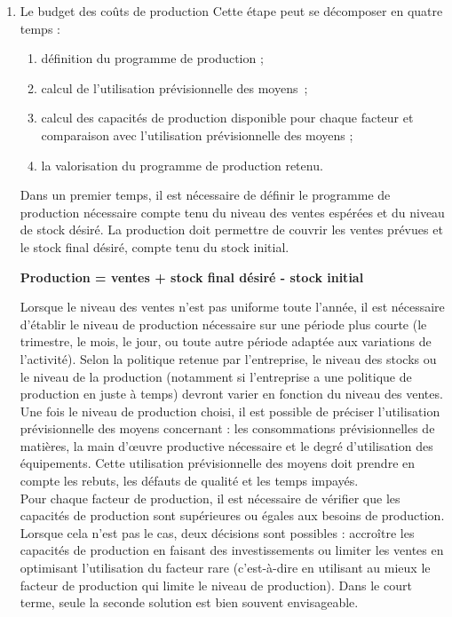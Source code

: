 \documentclass{tufte-handout}
\begin{document}
\begin{enumerate}
\item Le budget des coûts de production
\label{sec:orgf7d48d8}
Cette étape peut se décomposer en quatre temps :\\
\begin{enumerate}
\item définition du programme de production ;\\
\item calcul de l'utilisation prévisionnelle des moyens ;\\
\item calcul des capacités de production disponible pour chaque facteur et comparaison avec l'utilisation prévisionnelle des moyens ;\\
\item la valorisation du programme de production retenu.\\
\end{enumerate}
Dans un premier temps, il est nécessaire de définir le programme de production nécessaire compte tenu du niveau des ventes espérées et du niveau de stock désiré. La production doit permettre de couvrir les ventes prévues et le stock final désiré, compte tenu du stock initial.\\
\begin{center}
\textbf{Production = ventes + stock final désiré - stock initial}\\
\end{center}
Lorsque le niveau des ventes n'est pas uniforme toute l'année, il est nécessaire d'établir le niveau de production nécessaire sur une période plus courte (le trimestre, le mois, le jour, ou toute autre période adaptée aux variations de l'activité). Selon la politique retenue par l'entreprise, le niveau des stocks ou le niveau de la production (notamment si l'entreprise a une politique de production en juste à temps) devront varier en fonction du niveau des ventes.\\
Une fois le niveau de production choisi, il est possible de préciser l'utilisation prévisionnelle des moyens concernant : les consommations prévisionnelles de matières, la main d'œuvre productive nécessaire et le degré d'utilisation des équipements. Cette utilisation prévisionnelle des moyens doit prendre en compte les rebuts, les défauts de qualité et les temps impayés.\\
Pour chaque facteur de production, il est nécessaire de vérifier que les capacités de production sont supérieures ou égales aux besoins de production. Lorsque cela n'est pas le cas, deux décisions sont possibles : accroître les capacités de production en faisant des investissements ou limiter les ventes en optimisant l'utilisation du facteur rare (c'est-à-dire en utilisant au mieux le facteur de production qui limite le niveau de production). Dans le court terme, seule la seconde solution est bien souvent envisageable.\\

\end{enumerate}
\end{document}
